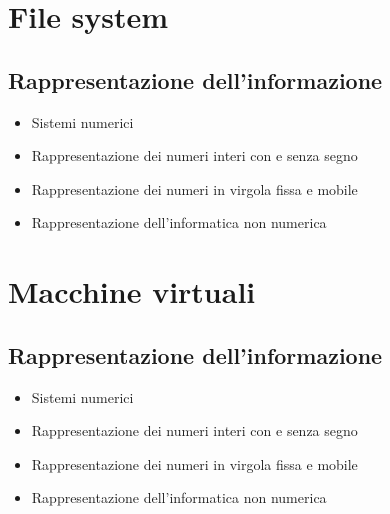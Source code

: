 \documentclass[10pt, a4paper, openany]{book}
\begin{document}
\chapter{File system}
\section{Rappresentazione dell'informazione}
\begin{itemize}
    \item Sistemi numerici
    \item Rappresentazione dei numeri interi con e senza segno
    \item Rappresentazione dei numeri in virgola fissa e mobile
    \item Rappresentazione dell'informatica non numerica
\end{itemize}

\chapter{Macchine virtuali}
\section{Rappresentazione dell'informazione}
\begin{itemize}
    \item Sistemi numerici
    \item Rappresentazione dei numeri interi con e senza segno
    \item Rappresentazione dei numeri in virgola fissa e mobile
    \item Rappresentazione dell'informatica non numerica
\end{itemize}
\end{document}
